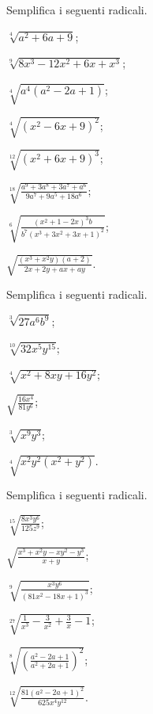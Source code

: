 \begin{esercizio}[\Ast]
 \label{ese:2.32}
Semplifica i seguenti radicali.
 \begin{multicols}{2}
 \begin{enumeratea}
 \item $\sqrt[4]{a^2+6a+9}$;
 \item $\sqrt[9]{8x^3-12x^2+6x+x^3}$;
 \item $\sqrt[4]{a^4(a^2-2a+1)}$;
 \item $\sqrt[4]{(x^2-6x+9)^2}$;
 \item $\sqrt[12]{(x^2+6x+9)^3}$;
 \item $\sqrt[18]{\frac{a^9+3a^8+3a^7+a^6}{9a^7+9a^5+18a^6}}$;
 \item $\sqrt[6]{\frac{(x^2+1-2x)^3b}{b^7\left(x^3+3x^2+3x+1\right)^2}}$;
 \item $\sqrt{\frac{\left(x^3+x^2y\right)(a+2)}{2x+2y+ax+ay}}$.
 \end{enumeratea}
 \end{multicols}
\end{esercizio}

\begin{esercizio}[\Ast]
 \label{ese:2.33}
Semplifica i seguenti radicali.
 \begin{multicols}{3}
 \begin{enumeratea}
 \item $\sqrt[3]{27 a^6 b^9}$;
 \item $\sqrt[10]{32 x^5 y^{15}}$;
 \item $\sqrt[4]{x^2 +8xy+16y^2}$;
 \item $\sqrt{\frac{16 x^4}{81 y^6}}$;
 \item $\sqrt[3]{x^9 y^3}$;
 \item $\sqrt[4]{x^{2}y^{2}\left(x^{2}+y^{2}\right)}$.
 \end{enumeratea}
 \end{multicols}
\end{esercizio}
\pagebreak
\begin{esercizio}[\Ast]
 \label{ese:2.34}
Semplifica i seguenti radicali.
 \begin{multicols}{2}
 \begin{enumeratea}
 \item $\sqrt[15]{\frac{8x^3 y^6}{125z^9}}$;
 \item $\sqrt{\frac{x^3+x^2 y-xy^2 -y^3}{x+y}}$;
 \item $\sqrt[9]{\frac{x^3 y^6}{(81x^2-18x+1)^3}}$;
 \item $\sqrt[27]{\frac{1}{x^3}-\frac{3}{x^2}+\frac{3}{x}-1}$;
 \item $\sqrt[8]{\left(\frac{a^2-2a+1}{a^2+2a+1}\right)^2}$;
 \item $\sqrt[12]{\frac{81(a^2-2a+1)^2}{625 x^4 y^{12}}}$.
 \end{enumeratea}
 \end{multicols}
\end{esercizio}

